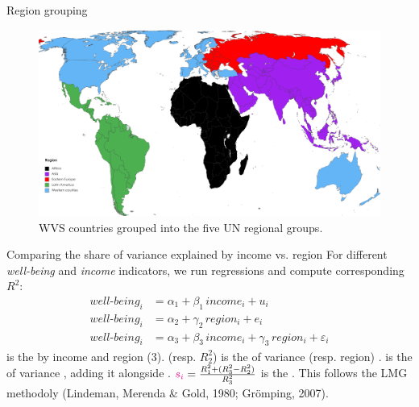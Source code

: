 \documentclass[aspectratio=169,xcolor=dvipsnames, 11pt,mathserif]{beamer}
\begin{document}
\begin{frame}{Region grouping}
    \begin{figure}
        \caption{WVS countries grouped into the five UN regional groups.}  
        \centering \includegraphics[height=.8\textheight]{../figures/region_groupings} %
    \end{figure}
\end{frame}

\begin{frame}{Comparing the share of variance explained by income vs. region}
    \bbvsp
    \ip For different \textit{well-being} and \textit{income} indicators, we run regressions and compute corresponding $R^2$:
    \begin{align} 
        well\text{-}being_i &= \alpha_1 + \beta_1\, income_i + u_i\\
        well\text{-}being_i &= \alpha_2 + \gamma_2\, region_i + e_i\\
        well\text{-}being_i &= \alpha_3 + \beta_3\, income_i + \gamma_3\, region_i + \varepsilon_i 
    \end{align} %
    \ip {} is the  by income and region (3).
    \ip {} (resp. $R^2_2$) is the  of variance  (resp. region) .
    \ip {} is the  of variance ,  adding it alongside . %
    \ip $\textcolor{magenta}{s_i} = \frac{R^2_1 + (R^2_3-R^2_2)}{R^2_3}$ is the .
    \ip This follows the LMG methodoly (Lindeman, Merenda \& Gold, 1980; Grömping, 2007).
    \ee
\end{frame}
              
\end{document}
